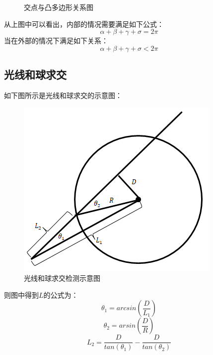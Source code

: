 \documentclass[10pt]{article}
\begin{document}
\begin{itemize}
\begin{figure}[H]
\begin{center}
\hspace{20pt}
\caption{交点与凸多边形关系图}
\end{center}
\end{figure}
\end{itemize}
从上图中可以看出，内部的情况需要满足如下公式：
$$\alpha+\beta+\gamma+\sigma=2\pi$$
当在外部的情况下满足如下关系：
$$\alpha+\beta+\gamma+\sigma < 2\pi$$

\subsection{光线和球求交}
如下图所示是光线和球求交的示意图：
\begin{figure}[H]
\begin{center}
\includegraphics[scale=0.6]{intersection_ray_sphere.png}
\caption{光线和球求交检测示意图}
\end{center}
\end{figure}
则图中得到$L$的公式为：
$$\theta_1=arcsin(\frac{D}{L_1})$$
$$\theta_2=arsin(\frac{D}{R})$$
$$L_2=\frac{D}{tan(\theta_1)}-\frac{D}{tan(\theta_2)}$$
\end{document}
